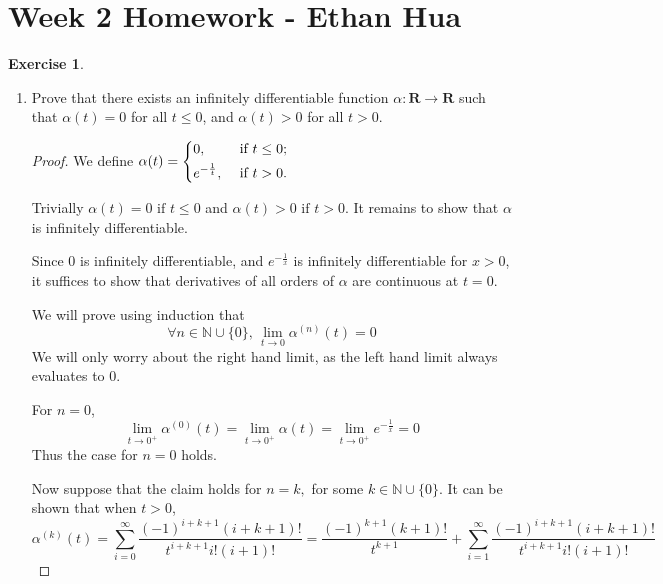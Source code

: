 \documentclass{article}
\newcommand{\R}{\mathbf{R}}
\theoremstyle{plain} %
\numberwithin{thm}{section} %
\theoremstyle{definition}
\newtheorem{exercise}[thm]{Exercise} %
\begin{document}
    \section{Week 2 Homework - Ethan Hua}
    \begin{exercise}
        \begin{enumerate}[label=(\alph*)]
            \item Prove that there exists an infinitely differentiable function $\alpha:\R\rightarrow \R$ such that $\alpha(t)=0$ for all $t\leq 0$, and $\alpha(t)>0$ for all $t>0$.
    
            \begin{proof}
                We define \(\alpha (t) =
                \begin{dcases}
                    0, &\text{ if } t \leq 0 ;\\
                    e^{-\frac{1}{t}} , &\text{ if } t > 0.\\
                \end{dcases}\) 
                
                Trivially \(\alpha (t) = 0 \text{ if } t \leq 0\) and \(\alpha (t) > 0 \text{ if }t > 0\). It remains to show that \(\alpha \) is infinitely differentiable.

                Since \(0\) is infinitely differentiable, and \(e^{-\frac{1}{x}}\) is infinitely differentiable for \(x > 0\), it suffices to show that derivatives of all orders of \(\alpha \) are continuous at \(t = 0\).

                We will prove using induction that
                \[
                    \forall n \in \mathbb{N} \cup \{0\} \text{, } \lim_{t \to 0} \alpha ^{(n)} (t) = 0
                \]
                We will only worry about the right hand limit, as the left hand limit always evaluates to \(0\).

                For \(n = 0\),
                \[
                    \lim_{t \to 0^+} \alpha ^{(0)} (t) = \lim_{t \to 0^+} \alpha (t) = \lim_{t \to 0^+} e^{-\frac{1}{x}} = 0
                \]
                Thus the case for \(n = 0\) holds.

                Now suppose that the claim holds for \(n = k,\) for some \(k \in \mathbb{N} \cup \{0\}\). It can be shown that when \(t > 0\), 
                \[
                    \alpha ^{(k)} (t) = \sum_{i=0}^{\infty} \frac{(-1)^{i+k+1}(i+k+1)!}{t^{i+k+1} i!(i+1)!} = \frac{(-1)^{k+1}(k+1)!}{t^{k+1}} + \sum_{i=1}^{\infty} \frac{(-1)^{i+k+1}(i+k+1)!}{t^{i+k+1} i!(i+1)!}
                \]


\end{proof}
\end{enumerate}
\end{exercise}
\end{document}
